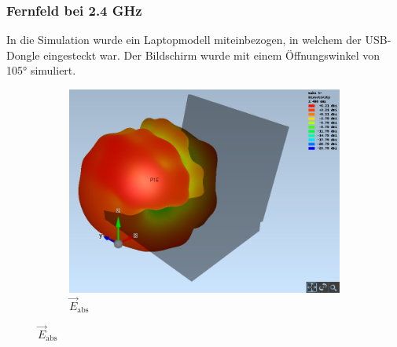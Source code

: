 \newpage
\subsubsection{Fernfeld bei 2.4 GHz}
In die Simulation wurde ein Laptopmodell miteinbezogen, in welchem der USB-Dongle eingesteckt war. Der Bildschirm wurde mit einem Öffnungswinkel von 105° simuliert.

\begin{figure}[h!]
	\centering
	\begin{subfigure}[b]{0.75\textwidth}
		\includegraphics[width=1\textwidth]{../fig/plt/crazy_stuff_l4_pcb_v2c_laptop_1a_105_2ghz4_3d_farfield_eabs_xyz.png}
		\caption{$\vec{E}_{\mathrm{abs}}$}
	\end{subfigure}
	
	\vspace{3mm}
	

\end{figure}
